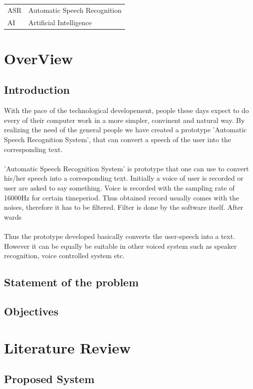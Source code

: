 \documentclass[a4paper,12pt,onepage]{article}
\begin{document}
\begin{tabular}{l l}
  ASR & Automatic Speech Recognition \\
  AI & Artificial Intelligence \\
\end{tabular}

\cleardoublepage
{}
\section{OverView}

\subsection{Introduction}
 With the pace of the technological developement, people these days expect to do every of their computer work in a more simpler, convinent and natural way. By realizing the need of the general people we have created a prototype 
'Automatic Speech Recognition System', that can convert a speech of the user into the corresponding text.
\\
\\
'Automatic Speech Recognition System' is prototype that one can use to convert his/her speech into a corresponding text. Initially a voice of user is recorded or user are asked to say something. Voice is recorded with the sampling rate of 16000Hz for certain timeperiod. Thus obtained record 
usually comes with the noises, therefore it has to be filtered. Filter is done by the software itself. After wards
\\
\\
Thus the prototype developed basically converts the user-speech into a text. However it can be equally be suitable in other voiced system such as 
speaker recognition, voice controlled system etc.
\newpage
\subsection{Statement of the problem}

\newpage
\subsection{Objectives}

\newpage
\section{Literature Review} 
	\subsection{Proposed System}
	\newpage
	
\end{document}
